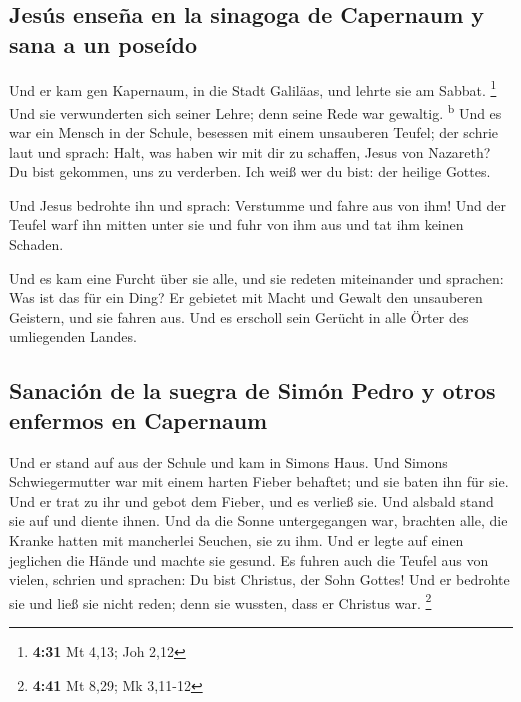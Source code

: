 \hypertarget{jesuxfas-enseuxf1a-en-la-sinagoga-de-capernaum-y-sana-a-un-poseuxeddo}{%
\subsection{Jesús enseña en la sinagoga de Capernaum y sana a un
poseído}\label{jesuxfas-enseuxf1a-en-la-sinagoga-de-capernaum-y-sana-a-un-poseuxeddo}}

 Und er kam gen Kapernaum, in die Stadt Galiläas, und
lehrte sie am Sabbat. \footnote{\textbf{4:31} Mt 4,13; Joh 2,12}
 Und sie verwunderten sich seiner Lehre; denn seine Rede
war gewaltig. \textsuperscript{b}  Und es war ein Mensch
in der Schule, besessen mit einem unsauberen Teufel; der schrie laut
 und sprach: Halt, was haben wir mit dir zu schaffen,
Jesus von Nazareth? Du bist gekommen, uns zu verderben. Ich weiß wer du
bist: der heilige Gottes.

 Und Jesus bedrohte ihn und sprach: Verstumme und fahre
aus von ihm! Und der Teufel warf ihn mitten unter sie und fuhr von ihm
aus und tat ihm keinen Schaden.

 Und es kam eine Furcht über sie alle, und sie redeten
miteinander und sprachen: Was ist das für ein Ding? Er gebietet mit
Macht und Gewalt den unsauberen Geistern, und sie fahren aus.
 Und es erscholl sein Gerücht in alle Örter des
umliegenden Landes.

\hypertarget{sanaciuxf3n-de-la-suegra-de-simuxf3n-pedro-y-otros-enfermos-en-capernaum}{%
\subsection{Sanación de la suegra de Simón Pedro y otros enfermos en
Capernaum}\label{sanaciuxf3n-de-la-suegra-de-simuxf3n-pedro-y-otros-enfermos-en-capernaum}}

 Und er stand auf aus der Schule und kam in Simons Haus.
Und Simons Schwiegermutter war mit einem harten Fieber behaftet; und sie
baten ihn für sie.  Und er trat zu ihr und gebot dem
Fieber, und es verließ sie. Und alsbald stand sie auf und diente ihnen.
 Und da die Sonne untergegangen war, brachten alle, die
Kranke hatten mit mancherlei Seuchen, sie zu ihm. Und er legte auf einen
jeglichen die Hände und machte sie gesund.  Es fuhren
auch die Teufel aus von vielen, schrien und sprachen: Du bist Christus,
der Sohn Gottes! Und er bedrohte sie und ließ sie nicht reden; denn sie
wussten, dass er Christus war. \footnote{\textbf{4:41} Mt 8,29; Mk
  3,11-12}

